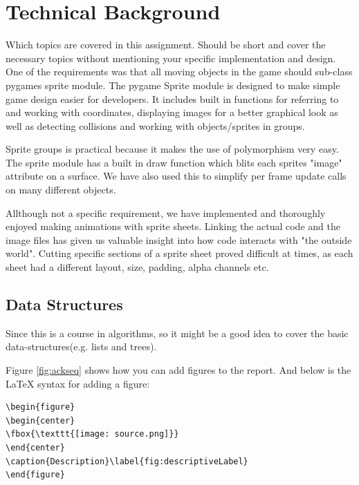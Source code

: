 \section{Technical Background}

Which topics are covered in this assignment. Should be short and cover the necessary topics without mentioning your specific implementation and design.\\

One of the requirements was that all moving objects in the game should sub-class
pygames sprite module. The pygame Sprite module is designed to make simple game 
design easier for developers. It includes built in functions for referring to 
and working with coordinates, displaying images for a better graphical look as
well as detecting collisions and working with objects/sprites in groups. 

Sprite groups is practical because it makes the use of polymorphism very easy.
The sprite module has a built in draw function which blits each sprites "image" 
attribute on a surface. We have also used this to simplify per frame update calls
on many different objects.

Allthough not a specific requirement, we have implemented and thoroughly enjoyed 
making animations with sprite sheets. Linking the actual code and the image 
files has given us valuable insight into how code interacts with "the outside world".
Cutting specific sections of a sprite sheet proved difficult at times, as each sheet
had a different layout, size, padding, alpha channels etc. 


\subsection{Data Structures}

Since this is a course in algorithms, so it might be a good idea to cover the basic data-structures(e.g. lists and trees). 

Figure \ref{fig:ackseq} shows how you can add figures to the report. And below is the LaTeX syntax for adding a figure:

\begin{verbatim}
\begin{figure}
\begin{center}
\fbox{\texttt{[image: source.png]}}
\end{center}
\caption{Description}\label{fig:descriptiveLabel}
\end{figure}
\end{verbatim}

